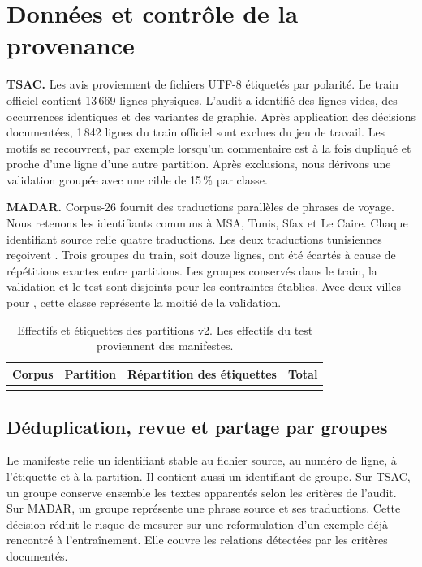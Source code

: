 \section{Données et contrôle de la provenance}\label{sec:data}

\textbf{TSAC.} Les avis proviennent de fichiers UTF-8 étiquetés par polarité. Le train officiel contient 13\,669 lignes physiques. L’audit a identifié des lignes vides, des occurrences identiques et des variantes de graphie. Après application des décisions documentées, 1\,842 lignes du train officiel sont exclues du jeu de travail. Les motifs se recouvrent, par exemple lorsqu’un commentaire est à la fois dupliqué et proche d’une ligne d’une autre partition. Après exclusions, nous dérivons une validation groupée avec une cible de 15\,\% par classe.

\textbf{MADAR.} Corpus-26 fournit des traductions parallèles de phrases de voyage. Nous retenons les identifiants communs à MSA, Tunis, Sfax et Le Caire. Chaque identifiant source relie quatre traductions. Les deux traductions tunisiennes reçoivent . Trois groupes du train, soit douze lignes, ont été écartés à cause de répétitions exactes entre partitions. Les groupes conservés dans le train, la validation et le test sont disjoints pour les contraintes établies. Avec deux villes pour , cette classe représente la moitié de la validation.

\begin{table}[htbp]
\centering\small
\caption{Effectifs et étiquettes des partitions v2. Les effectifs du test proviennent des manifestes.}\label{tab:partitions}
\begin{tabularx}{\linewidth}{@{}llYr@{}}
\toprule
Corpus & Partition & Répartition des étiquettes & Total \\
\midrule
{}
\bottomrule
\end{tabularx}
\end{table}

\subsection{Déduplication, revue et partage par groupes}
Le manifeste relie un identifiant stable au fichier source, au numéro de ligne, à l’étiquette et à la partition. Il contient aussi un identifiant de groupe. Sur TSAC, un groupe conserve ensemble les textes apparentés selon les critères de l’audit. Sur MADAR, un groupe représente une phrase source et ses traductions. Cette décision réduit le risque de mesurer sur une reformulation d’un exemple déjà rencontré à l’entraînement. Elle couvre les relations détectées par les critères documentés.

